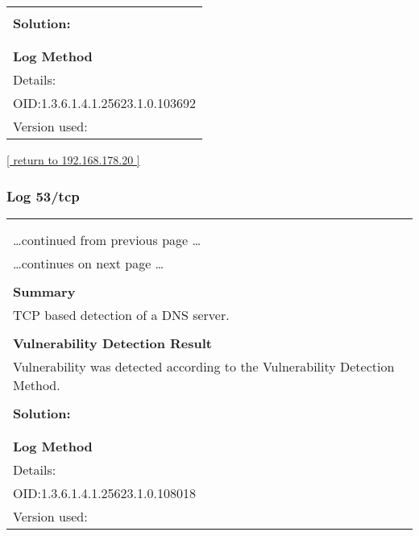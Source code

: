 \documentclass{article}
\begin{document}
\begin{longtable}{|p{}|}
          \hline
          \\
\textbf{Solution:}\\
\\


        \hline
        \\
\textbf{Log Method}\\
Details:
\rowcolor{white}{\verb=SSL/TLS: Collect and Report Certificate Details=}\\
OID:1.3.6.1.4.1.25623.1.0.103692\\
Version used:
\rowcolor{white}{\verb=2021-12-10T12:48:00Z=}\\
\end{longtable}

\begin{footnotesize}\hyperref[host:192.168.178.20]{[ return to 192.168.178.20 ]}\end{footnotesize}
\subsubsection{Log 53/tcp}
\label{port:192.168.178.20 53/tcp Log}

\begin{longtable}{|p{}|}
\hline
\rowcolor{gvm_log}{\color{white}{Log (CVSS: 0.0) }}\\
\rowcolor{gvm_log}{\color{white}{NVT: DNS Server Detection (TCP)}}\\
\hline
\endfirsthead
\hfill\ldots continued from previous page \ldots \\
\hline
\endhead
\hline
\ldots continues on next page \ldots \\
\endfoot
\hline
\endlastfoot
\\
\textbf{Summary}\\
TCP based detection of a DNS server.\\

        \hline
        \\
\textbf{Vulnerability Detection Result}\\
Vulnerability was detected according to the Vulnerability Detection Method.\\

          \hline
          \\
\textbf{Solution:}\\
\\


        \hline
        \\
\textbf{Log Method}\\
Details:
\rowcolor{white}{\verb=DNS Server Detection (TCP)=}\\
OID:1.3.6.1.4.1.25623.1.0.108018\\
Version used:
\rowcolor{white}{\verb=2021-11-30T08:05:58Z=}\\
\end{longtable}
\end{document}
